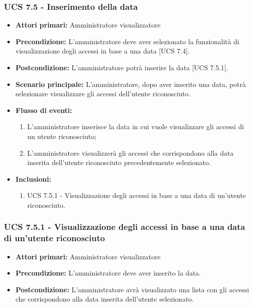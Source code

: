 \subsubsection{UCS 7.5 - Inserimento della data }
\begin{itemize}
	\item \textbf{Attori primari:} Amministratore visualizzatore
	\item \textbf{Precondizione:} L'amministratore deve aver selezionato la funzionalità di visualizzazione degli accessi in base a una data [UCS 7.4].
	\item \textbf{Postcondizione:} L'amministratore potrà inserire la data [UCS 7.5.1].
	\item \textbf{Scenario principale:} L'amministratore, dopo aver inserito una data, potrà selezionare visualizzare gli accessi dell'utente riconosciuto.
	\item \textbf{Flusso di eventi:} 
	\begin{enumerate}
		\item L'amministratore inserisce la data in cui vuole visualizzare gli accessi di un utente riconosciuto;
		\item L'amministratore visualizzerà gli accessi che corrispondono alla data inserita dell'utente riconosciuto precedentemente selezionato.	
	\end{enumerate}
	\item \textbf{Inclusioni:}
	\begin{enumerate}
		\item UCS 7.5.1 - Visualizzazione degli accessi in base a una data di un'utente riconosciuto.
	\end{enumerate}
\end{itemize}

\subsubsection{UCS 7.5.1 - Visualizzazione degli accessi in base a una data di un'utente riconosciuto }
\begin{itemize}
	\item \textbf{Attori primari:} Amministratore visualizzatore
	\item \textbf{Precondizione:} L'amministratore deve aver inserito la data.
	\item \textbf{Postcondizione:} L'amministratore avrà visualizzato una lista con gli accessi che corrispondono alla data inserita dell'utente selezionato.
\end{itemize}


